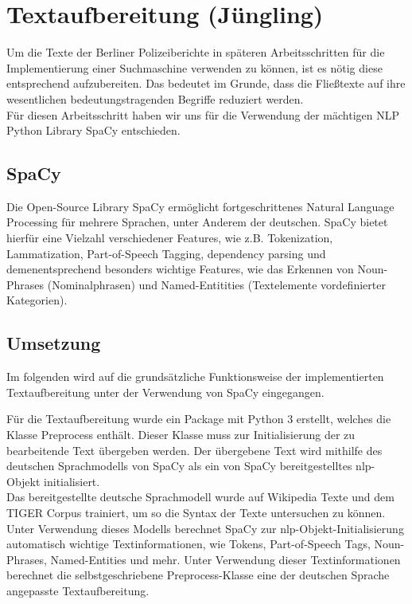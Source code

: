 \chapter{Textaufbereitung \small(Jüngling)}

Um die Texte der Berliner Polizeiberichte in späteren Arbeitsschritten für die Implementierung einer Suchmaschine verwenden zu können, ist es nötig diese entsprechend aufzubereiten. Das bedeutet im Grunde, dass die Fließtexte auf ihre wesentlichen bedeutungstragenden Begriffe reduziert werden. 
\\Für diesen Arbeitsschritt haben wir uns für die Verwendung der mächtigen NLP Python Library SpaCy entschieden. 

\section{SpaCy}
Die Open-Source Library SpaCy ermöglicht fortgeschrittenes Natural Language Processing für mehrere Sprachen, unter Anderem der deutschen. SpaCy bietet hierfür eine Vielzahl verschiedener Features, wie z.B. Tokenization, Lammatization, Part-of-Speech Tagging, dependency parsing und demenentsprechend besonders wichtige Features, wie das Erkennen von Noun-Phrases (Nominalphrasen) und Named-Entitities (Textelemente vordefinierter Kategorien). 

\section{Umsetzung}
Im folgenden wird auf die grundsätzliche Funktionsweise der implementierten Textaufbereitung unter der Verwendung von SpaCy eingegangen.

Für die Textaufbereitung wurde ein Package mit Python 3 erstellt, welches die Klasse Preprocess enthält. Dieser Klasse muss zur Initialisierung der zu bearbeitende Text übergeben werden. Der übergebene Text wird mithilfe des deutschen Sprachmodells von SpaCy als ein von SpaCy bereitgestelltes nlp-Objekt initialisiert. 
\\Das bereitgestellte deutsche Sprachmodell wurde auf Wikipedia Texte und dem TIGER Corpus trainiert, um so die Syntax der Texte untersuchen zu können. Unter Verwendung dieses Modells berechnet SpaCy zur nlp-Objekt-Initialisierung automatisch wichtige Textinformationen, wie Tokens, Part-of-Speech Tags, Noun-Phrases, Named-Entities und mehr. Unter Verwendung dieser Textinformationen berechnet die selbstgeschriebene Preprocess-Klasse eine der deutschen Sprache angepasste Textaufbereitung.

